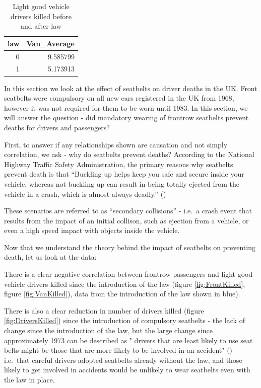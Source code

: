 \documentclass[11pt,a4paper,]{article}
\begin{document}
\begin{table}

\caption{\label{tab:VanTable}Light good vehicle drivers killed before and after law}
\centering
\begin{tabular}[t]{r|r}
\hline
law & Van\_Average\\
\hline
0 & 9.585799\\
\hline
1 & 5.173913\\
\hline
\end{tabular}
\end{table}

In this section we look at the effect of seatbelts on driver deaths in the UK. Front seatbelts were compulsory on all new cars registered in the UK from 1968, however it was not required for them to be worn until 1983. In this section, we will answer the question - did mandatory wearing of frontrow seatbelts prevent deaths for drivers and passengers?

First, to answer if any relationships shown are causation and not simply correlation, we ask - why do seatbelts prevent deaths? According to the National Highway Traffic Safety Administration, the primary reasons why seatbelts prevent death is that ``Buckling up helps keep you safe and secure inside your vehicle, whereas not buckling up can result in being totally ejected from the vehicle in a crash, which is almost always deadly.'' (\cite{NHTSA})

These scenarios are referred to as ``secondary collisions'' - i.e.~a crash event that results from the impact of an initial collison, such as ejection from a vehicle, or even a high speed impact with objects inside the vehicle.

Now that we understand the theory behind the impact of seatbelts on preventing death, let us look at the data:

There is a clear negative correlation between frontrow passengers and light good vehicle drivers killed since the introduction of the law (figure \ref{fig:FrontKilled}, figure \ref{fig:VanKilled}), data from the introduction of the law shown in blue).

There is also a clear reduction in number of drivers killed (figure \ref{fig:DriversKilled}) since the introduction of compulsory seatbelts - the lack of change since the introduction of the law, but the large change since approximately 1973 can be described as " drivers that are least likely to use seat belts might be those that are more likely to be involved in an accident" (\cite{Cohen}) - i.e.~that careful drivers adopted seatbelts already without the law, and those likely to get involved in accidents would be unlikely to wear seatbelts even with the law in place.
\end{document}
